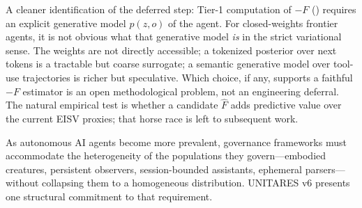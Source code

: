 \documentclass[11pt,twocolumn]{article}
\begin{document}
A cleaner identification of the deferred step: Tier-1 computation
of $-F$ () requires an explicit
generative model $p(z, o)$ of the agent. For closed-weights frontier
agents, it is not obvious what that generative model \emph{is} in
the strict variational sense. The weights are not directly
accessible; a tokenized posterior over next tokens is a tractable
but coarse surrogate; a semantic generative model over tool-use
trajectories is richer but speculative. Which choice, if any,
supports a faithful $-F$ estimator is an open methodological
problem, not an engineering deferral. The natural empirical test
is whether a candidate $\hat{F}$ adds predictive value over the
current EISV proxies; that horse race is left to subsequent work.

As autonomous AI agents become more prevalent, governance
frameworks must accommodate the heterogeneity of the populations
they govern---embodied creatures, persistent observers,
session-bounded assistants, ephemeral parsers---without
collapsing them to a homogeneous distribution. UNITARES v6
presents one structural commitment to that requirement.



\end{document}
